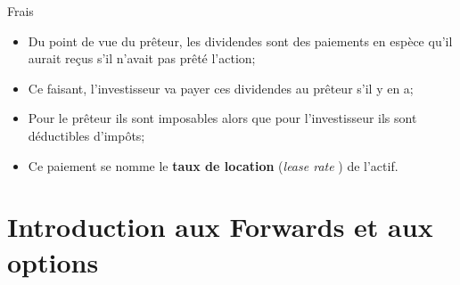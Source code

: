 \documentclass[10pt, french]{article}
\begin{document}
\begin{multicols*}{2}
\begin{conceptgen}{Frais}
\begin{description}
\begin{itemize}[leftmargin = *]
		\item	Du point de vue du prêteur, les dividendes sont des paiements en espèce qu'il aurait reçus s'il n'avait pas prêté l'action;
		\item	Ce faisant, l'investisseur va payer ces dividendes au prêteur s'il y en a;
		\item	Pour le prêteur ils sont imposables alors que pour l'investisseur ils sont déductibles d'impôts;
		\item	Ce paiement se nomme le \textbf{taux de location} (\og \textit{lease rate} \fg{}) de l'actif.
		\end{itemize}
\end{description}
\end{conceptgen}

\newpage

\section{Introduction aux Forwards et aux options}


\end{multicols*}
\end{document}
